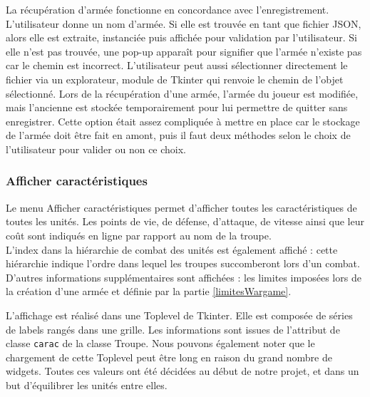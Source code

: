\documentclass[a4paper]{article} %
\begin{document}
La récupération d'armée fonctionne en concordance avec l'enregistrement. L'utilisateur donne un nom d'armée. Si elle est trouvée en tant que fichier JSON, alors elle est extraite, instanciée puis affichée pour validation par l'utilisateur. Si elle n'est pas trouvée, une pop-up apparaît pour signifier que l'armée n'existe pas car le chemin est incorrect. L'utilisateur peut aussi sélectionner directement le fichier via un explorateur, module de Tkinter qui renvoie le chemin de l'objet sélectionné. Lors de la récupération d'une armée, l'armée du joueur est modifiée, mais l'ancienne est stockée temporairement pour lui permettre de quitter sans enregistrer. Cette option était assez compliquée à mettre en place car le stockage de l'armée doit être fait en amont, puis il faut deux méthodes selon le choix de l'utilisateur pour valider ou non ce choix.

		\subsubsection{Afficher caractéristiques}\label{afficherCarac}
	Le menu Afficher caractéristiques permet d'afficher toutes les caractéristiques de toutes les unités. Les points de vie, de défense, d'attaque, de vitesse ainsi que leur coût sont indiqués en ligne par rapport au nom de la troupe.\\

L'index dans la hiérarchie de combat des unités est également affiché : cette hiérarchie indique l'ordre dans lequel les troupes succomberont lors d'un combat. D'autres informations supplémentaires sont affichées : les limites imposées lors de la création d'une armée et définie par la partie \ref{limitesWargame}.

L'affichage est réalisé dans une Toplevel de Tkinter. Elle est composée de séries de labels rangés dans une grille. Les informations sont issues de l'attribut de classe \texttt{carac} de la classe Troupe. Nous pouvons également noter que le chargement de cette Toplevel peut être long en raison du grand nombre de widgets. Toutes ces valeurs ont été décidées au début de notre projet, et dans un but d'équilibrer les unités entre elles.
\end{document}
